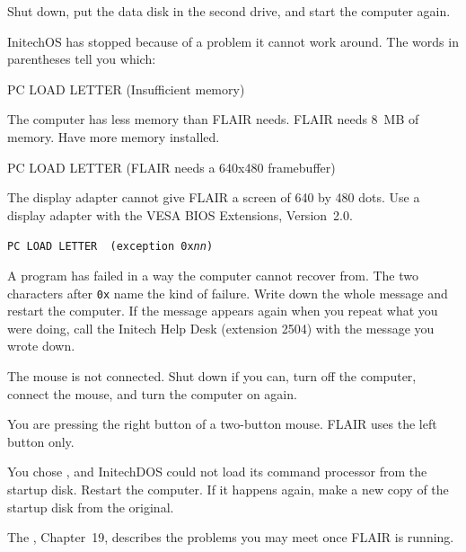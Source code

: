 
\Solution Shut down, put the data disk in the second drive, and start the
computer again.

InitechOS has stopped because of a problem it cannot work around.  The
words in parentheses tell you which:
\begin{TypeIn}
PC LOAD LETTER  (Insufficient memory)
\end{TypeIn}
\Cause The computer has less memory than FLAIR needs.
\Solution FLAIR needs 8~MB of memory.  Have more memory
installed.
\begin{TypeIn}
PC LOAD LETTER  (FLAIR needs a 640x480 framebuffer)
\end{TypeIn}
\Cause The display adapter cannot give FLAIR a screen of 640 by 480 dots.
\Solution Use a display adapter with the VESA BIOS Extensions,
Version~2.0.
\par\noindent\hspace*{1.5em}\texttt{PC LOAD LETTER\ \ (exception 0x\textit{nn})}\par
\Cause A program has failed in a way the computer cannot recover from.  The
two characters after \texttt{0x} name the kind of failure.
\Solution Write down the whole message and restart the computer.  If the
message appears again when you repeat what you were doing, call the
Initech Help Desk (extension 2504) with the message you wrote down.

\Cause The mouse is not connected.
\Solution Shut down if you can, turn off the computer, connect the mouse,
and turn the computer on again.

\Cause You are pressing the right button of a two-button mouse.
\Solution FLAIR uses the left button only.

\Cause You chose , and InitechDOS could not
load its command processor from the startup disk.
\Solution Restart the computer.  If it happens again, make a new copy of
the startup disk from the original.

The , Chapter~19, describes the problems you
may meet once FLAIR is running.
